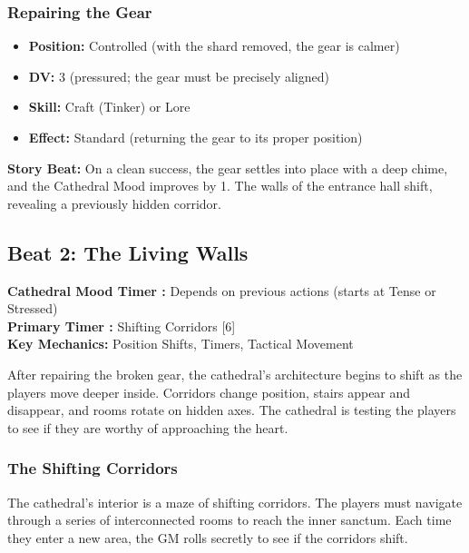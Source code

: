 \documentclass{article}
\begin{document}
\subsubsection{Repairing the Gear}

\begin{itemize}
    \item \textbf{Position:} Controlled (with the shard removed, the gear is calmer)
    \item \textbf{DV:} 3 (pressured; the gear must be precisely aligned)
    \item \textbf{Skill:} Craft (Tinker) or Lore
    \item \textbf{Effect:} Standard (returning the gear to its proper position)
\end{itemize}

\begin{storybox}
\textbf{Story Beat:} On a clean success, the gear settles into place with a deep chime, and the Cathedral Mood improves by 1. The walls of the entrance hall shift, revealing a previously hidden corridor.
\end{storybox}

\subsection{Beat 2: The Living Walls}

\begin{mechanicbox}
\textbf{Cathedral Mood Timer :} Depends on previous actions (starts at Tense or Stressed) \\
\textbf{Primary Timer :} Shifting Corridors [6] \\
\textbf{Key Mechanics:} Position Shifts, Timers, Tactical Movement
\end{mechanicbox}

After repairing the broken gear, the cathedral's architecture begins to shift as the players move deeper inside. Corridors change position, stairs appear and disappear, and rooms rotate on hidden axes. The cathedral is testing the players to see if they are worthy of approaching the heart.

\subsubsection{The Shifting Corridors}

The cathedral's interior is a maze of shifting corridors. The players must navigate through a series of interconnected rooms to reach the inner sanctum. Each time they enter a new area, the GM rolls secretly to see if the corridors shift.
\end{document}

